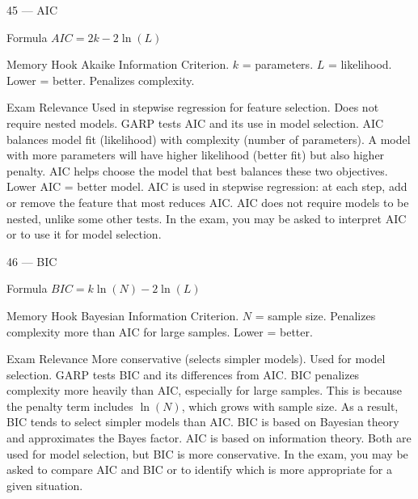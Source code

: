 \documentclass[aspectratio=169,8pt]{beamer}
\begin{document}
	\begin{frame}{45 --- AIC}
		\begin{block}{Formula}
			$AIC = 2k - 2\ln(L)$
		\end{block}
		\begin{block}{Memory Hook}
			Akaike Information Criterion. $k$ = parameters. $L$ = likelihood. Lower = better. Penalizes complexity.
		\end{block}
		\begin{block}{Exam Relevance}
			Used in stepwise regression for feature selection. Does not require nested models. GARP tests AIC and its use in model selection. AIC balances model fit (likelihood) with complexity (number of parameters). A model with more parameters will have higher likelihood (better fit) but also higher penalty. AIC helps choose the model that best balances these two objectives. Lower AIC = better model. AIC is used in stepwise regression: at each step, add or remove the feature that most reduces AIC. AIC does not require models to be nested, unlike some other tests. In the exam, you may be asked to interpret AIC or to use it for model selection.
		\end{block}
	\end{frame}
	
	\begin{frame}{46 --- BIC}
		\begin{block}{Formula}
			$BIC = k\ln(N) - 2\ln(L)$
		\end{block}
		\begin{block}{Memory Hook}
			Bayesian Information Criterion. $N$ = sample size. Penalizes complexity more than AIC for large samples. Lower = better.
		\end{block}
		\begin{block}{Exam Relevance}
			More conservative (selects simpler models). Used for model selection. GARP tests BIC and its differences from AIC. BIC penalizes complexity more heavily than AIC, especially for large samples. This is because the penalty term includes $\ln(N)$, which grows with sample size. As a result, BIC tends to select simpler models than AIC. BIC is based on Bayesian theory and approximates the Bayes factor. AIC is based on information theory. Both are used for model selection, but BIC is more conservative. In the exam, you may be asked to compare AIC and BIC or to identify which is more appropriate for a given situation.
		\end{block}
	\end{frame}
	
\end{document}
